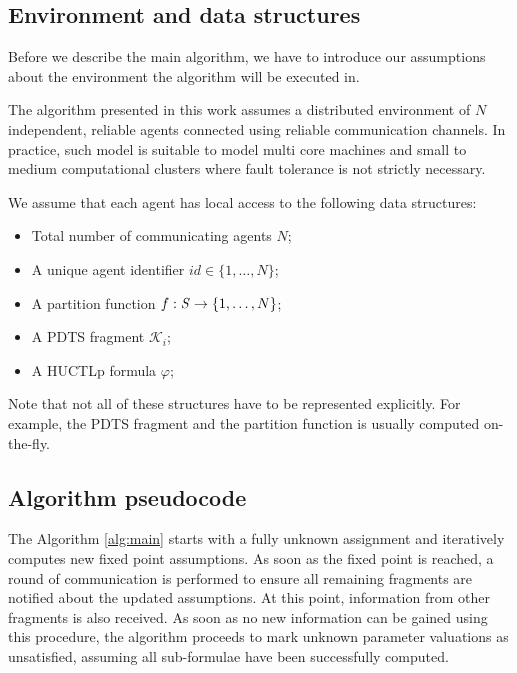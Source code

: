 \subsection{Environment and data structures}

Before we describe the main algorithm, we have to introduce our assumptions about the environment the algorithm will be executed in.

The algorithm presented in this work assumes a distributed environment of $N$ independent, reliable agents connected using reliable communication channels. In practice, such model is suitable to model multi core machines and small to medium computational clusters where fault tolerance is not strictly necessary.

We assume that each agent has local access to the following data structures:

\begin{itemize}
	\item Total number of communicating agents $N$;
	\item A unique agent identifier $id \in \{ 1, \ldots, N \}$;
	\item A partition function $f : \mathit{S} \to \{1, \ldots, N \}$;
	\item A \ac{PDTS} fragment $\mathcal{K}_i$;
	\item A \ac{HUCTLp} formula $\varphi$;
\end{itemize}

Note that not all of these structures have to be represented explicitly. For example, the \ac{PDTS} fragment and the partition function is usually computed on-the-fly.

\subsection{Algorithm pseudocode}

The Algorithm \ref{alg:main} starts with a fully unknown assignment and iteratively computes new fixed point assumptions. As soon as the fixed point is reached, a round of communication is performed to ensure all remaining fragments are notified about the updated assumptions. At this point, information from other fragments is also received. As soon as no new information can be gained using this procedure, the algorithm proceeds to mark unknown parameter valuations as unsatisfied, assuming all sub-formulae have been successfully computed.

